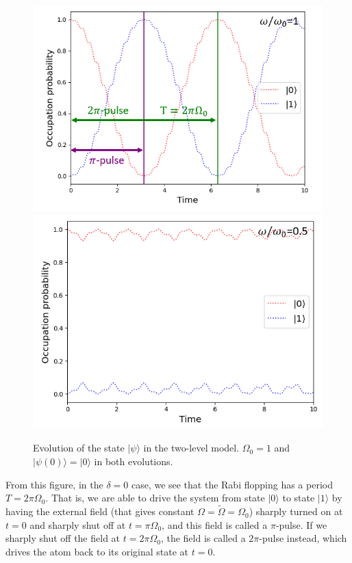 \documentclass[reprint, amsmath, amssymb, aps]{revtex4-2}
\newcommand{\that}[1]{\widetilde{#1}}
\begin{document}
\begin{figure}
\includegraphics[scale=0.59]{F7}
\includegraphics[scale=0.59]{F8}
\caption{Evolution of the state $|\psi\rangle$ in the two-level model. $\Omega_0 = 1$ and $|\psi(0)\rangle = |0\rangle$ in both evolutions.}
\end{figure}
From this figure, in the $\delta = 0$ case, we see that the Rabi flopping has a period $T=2\pi\Omega_0$. That is, we are able to drive the system from state $|0\rangle$ to state $|1\rangle$ by having the external field (that gives constant $\Omega = \that{\Omega} = \Omega_0$) sharply turned on at $t = 0$ and sharply shut off at $t = \pi \Omega_0$, and this field is called a $\pi$-pulse. If we sharply shut off the field at $t = 2\pi \Omega_0$, the field is called a $2\pi$-pulse instead, which drives the atom back to its original state at $t = 0$. 
\end{document}
